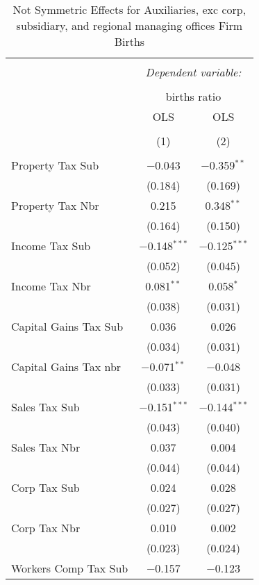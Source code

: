 
\begin{table}[!htbp] \centering 
  \caption{Not Symmetric Effects for  Auxiliaries, exc corp, subsidiary, and regional managing offices Firm Births} 
  \label{} 
\begin{tabular}{@{\extracolsep{5pt}}lcc} 
\\[-1.8ex]\hline 
\hline \\[-1.8ex] 
 & \multicolumn{2}{c}{\textit{Dependent variable:}} \\ 
\cline{2-3} 
\\[-1.8ex] & \multicolumn{2}{c}{births ratio} \\ 
 & OLS & OLS \\ 
\\[-1.8ex] & (1) & (2)\\ 
\hline \\[-1.8ex] 
 Property Tax Sub & $-$0.043 & $-$0.359$^{**}$ \\ 
  & (0.184) & (0.169) \\ 
  Property Tax Nbr & 0.215 & 0.348$^{**}$ \\ 
  & (0.164) & (0.150) \\ 
  Income Tax Sub & $-$0.148$^{***}$ & $-$0.125$^{***}$ \\ 
  & (0.052) & (0.045) \\ 
  Income Tax Nbr & 0.081$^{**}$ & 0.058$^{*}$ \\ 
  & (0.038) & (0.031) \\ 
  Capital Gains Tax Sub & 0.036 & 0.026 \\ 
  & (0.034) & (0.031) \\ 
  Capital Gains Tax nbr & $-$0.071$^{**}$ & $-$0.048 \\ 
  & (0.033) & (0.031) \\ 
  Sales Tax Sub & $-$0.151$^{***}$ & $-$0.144$^{***}$ \\ 
  & (0.043) & (0.040) \\ 
  Sales Tax Nbr & 0.037 & 0.004 \\ 
  & (0.044) & (0.044) \\ 
  Corp Tax Sub & 0.024 & 0.028 \\ 
  & (0.027) & (0.027) \\ 
  Corp Tax Nbr & 0.010 & 0.002 \\ 
  & (0.023) & (0.024) \\ 
  Workers Comp Tax Sub & $-$0.157 & $-$0.123 \\ 

\end{tabular}
\end{table}
